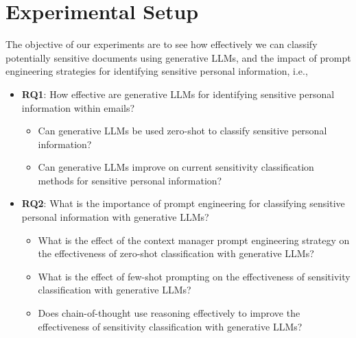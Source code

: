 \section{Experimental Setup}

The objective of our experiments are to see how effectively we can classify potentially sensitive documents using generative LLMs, and the impact of prompt engineering strategies for identifying sensitive personal information, i.e.,
\begin{itemize}
    \item \textbf{RQ1}: How effective are generative LLMs for identifying sensitive personal information within emails?
    \begin{itemize}
    \item Can generative LLMs be used zero-shot to classify sensitive personal information?
    \item Can generative LLMs improve on current sensitivity classification methods for sensitive personal information?
    \end{itemize}
    \item \textbf{RQ2}: What is the importance of prompt engineering for classifying sensitive personal information with generative LLMs?
    \begin{itemize}
    \item What is the effect of the context manager prompt engineering strategy on the effectiveness of zero-shot classification with generative LLMs?
    \item What is the effect of few-shot prompting on the effectiveness of sensitivity classification with generative LLMs?
    \item Does chain-of-thought use reasoning effectively to improve the effectiveness of sensitivity classification with generative LLMs?
    \end{itemize}
\end{itemize}

